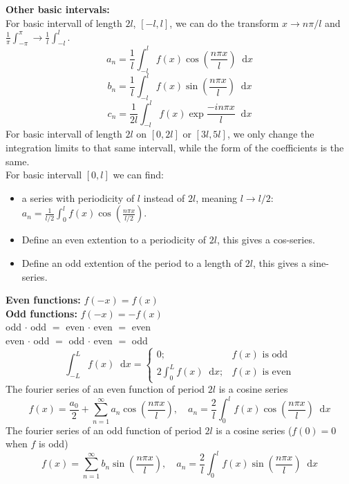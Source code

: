 \documentclass[a4paper, 10pt]{article}
\newcommand*\diff{\mathop{}\!\mathrm{d}}
\begin{document}
\begin{multicols*}{3}
\textbf{Other basic intervals:}\\
For basic intervall of length $2l$, $[-l, l]$, we can do the transform $x\rightarrow n\pi/l$ and $\frac{1}{\pi}\int_{-\pi}^\pi \rightarrow \frac{1}{l}\int_{-l}^l$.
$$ a_n = \frac{1}{l}\int_{-l}^l f(x) \cos{\left(\frac{n\pi x}{l}\right)} \diff x$$
$$ b_n = \frac{1}{l}\int_{-l}^l f(x) \sin{\left(\frac{n\pi x}{l}\right)} \diff x$$
$$ c_n = \frac{1}{2l}\int_{-l}^l f(x) \exp{\frac{-in\pi x}{l}} \diff x$$
For basic intervall of length $2l$ on $[0, 2l]$ or $[3l, 5l]$, we only change the integration limits to that same intervall, while the form of the coefficients is the same.\\
For basic intervall $[0, l]$ we can find:
\begin{itemize}
  \item a series with periodicity of $l$ instead of $2l$, meaning $l\rightarrow l/2$: $a_n = \frac{1}{l/2}\int_0^l f(x)\cos{\left( \frac{n\pi x}{l/2} \right)}$.
  \item Define an even extention to a periodicity of $2l$, this gives a cos-series.
  \item Define an odd extention of the period to a length of $2l$, this gives a sine-series.
\end{itemize}
\textbf{Even functions:} $f(-x)=f(x)$\\
\textbf{Odd  functions:} $f(-x)=-f(x)$\\
odd $\cdot$ odd $=$ even $\cdot$ even $=$ even\\
even $\cdot$ odd $=$ odd $\cdot$ even $=$ odd
\begin{equation*} \int_{-L}^{L}f(x) \diff x = \begin{cases}
0; & f(x) \text{ is odd} \\
2\int_0^L f(x) \diff x; & f(x) \text{ is even}
\end{cases} \end{equation*}
The fourier series of an even function of period $2l$ is a cosine series
$$f(x)= \frac{a_0}{2} + \sum_{n=1}^{\infty} a_n \cos{\left( \frac{n\pi x}{l} \right)},\quad a_n = \frac{2}{l}\int_0^lf(x)\cos{\left( \frac{n\pi x}{l} \right)}\diff x $$
The fourier series of an odd function of period $2l$ is a cosine series ($f(0)=0$ when $f$ is odd)
$$f(x)= \sum_{n=1}^{\infty} b_n \sin{\left( \frac{n\pi x}{l} \right)},\quad a_n = \frac{2}{l}\int_0^lf(x)\sin{\left( \frac{n\pi x}{l} \right)}\diff x $$







\end{multicols*}
\end{document}
